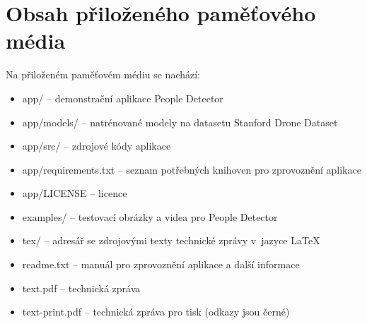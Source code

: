 
\chapter{Obsah přiloženého paměťového média}

Na přiloženém paměťovém médiu se nachází:

\begin{itemize}
    \item app/ -- demonstrační aplikace People Detector
    \item app/models/ -- natrénované modely na datasetu Stanford Drone Dataset
    \item app/src/ -- zdrojové kódy aplikace
    \item app/requirements.txt -- seznam potřebných knihoven pro zprovoznění aplikace
    \item app/LICENSE -- licence
    \item examples/ -- testovací obrázky a videa pro People Detector
    \item tex/ -- adresář se zdrojovými texty technické zprávy v~jazyce \LaTeX
    \item readme.txt -- manuál pro zprovoznění aplikace a další informace
    \item text.pdf -- technická zpráva
    \item text-print.pdf -- technická zpráva pro tisk (odkazy jsou černé)
\end{itemize}

